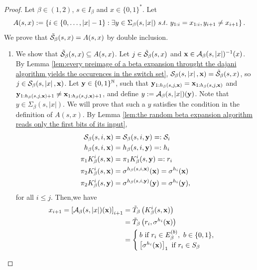\begin{proof}
    Let $\beta \in (1,2)$, $s \in I_\beta$ and $x \in \{0,1\}^\ast$. Let 
    \begin{equation}
        A(s,x) := \left\{ i \in \{0,\ldots, \left| x \right| -1\}: \exists y \in \Sigma_\beta(s,\left| x \right|) \ s.t. \ y_{1:i} = x_{1:i}, y_{i+1} \neq x_{i+1} \right\}.
    \end{equation}
    We prove that $\tilde {\mathcal{S}}_\beta(s,x) = A(s,x)$ by double inclusion.
    \begin{enumerate}[label = (\alph*)]
        \item We show that $\tilde {\mathcal{S}}_\beta(s,x) \subseteq  A(s,x)$. Let $j \in \tilde {\mathcal{S}}_\beta(s,x)$ and ${\bf x} \in \mathcal{A}_\beta(s,\left| x \right|)^{-1}(x)$. By Lemma \ref{lem:every preimage of a beta expansion throught the dajani algorithm yields the occurences in the switch set}, $\mathcal{S}_\beta(s,\left| x \right|, {\bf x}) = \tilde {\mathcal{S}}_\beta(s,x)$, so $j \in \mathcal{S}_\beta(s,\left| x \right|, {\bf x})$. Let ${\bf y} \in \{0,1\}^{\mathbb{N}}$, such that ${\bf y}_{1:h_\beta(s,j,{\bf x})} = {\bf x}_{1:h_\beta(s,j,{\bf x})}$ and ${\bf y}_{1:h_\beta(s,j,{\bf x})+1} \neq {\bf x}_{1:h_\beta(s,j,{\bf x})+1}$, and define $y := \mathcal{A}_\beta(s,\left| x \right|)({\bf y})$. Note that $y \in \Sigma_\beta(s,|x|)$. We will prove that such a $y$ satisfies the condition in the definition of $A(s,x)$. By Lemma \ref{lem:the random beta expansion algorithm reads only the first bits of its input}, 
        \begin{align}
            \mathcal{S}_\beta(s,i, {\bf x}) &= \mathcal{S}_\beta(s,i, {\bf y}) =: \mathcal{S}_i\\
            h_\beta(s,i,{\bf x}) &= h_\beta(s,i,{\bf y}) =: h_i\\
            \pi_1 K_\beta^i(s,{\bf x}) &= \pi_1 K_\beta^i(s,{\bf y}) =: r_i\\
            \pi_2 K_\beta^i(s,{\bf x}) &= \sigma^{h_\beta(s,i,{\bf x})}({\bf x}) = \sigma^{h_i}({\bf x})\\
            \pi_2 K_\beta^i(s,{\bf y}) &= \sigma^{h_\beta(s,i,{\bf y})}({\bf y}) = \sigma^{h_i}({\bf y}),
        \end{align}
        for all $i \leq j$. Then,we have 
        \begin{align}
            x_{i+1} = \left[\mathcal{A}_\beta(s,\left| x \right|)({\bf x})\right]_{i+1} &= \tilde T_\beta \left(K_\beta^i(s,{\bf x}) \right)\\
            &= \tilde T_\beta \left(r_i, \sigma^{h_i}({\bf x})\right)\\
            &= \begin{cases}
                b \ \text{if} \ r_i \in E_\beta^{(b)}, \ b \in \{0,1\},\\
                \left[\sigma^{h_i}({\bf x})\right]_1 \ \text{if} \ r_i \in S_\beta

\end{cases}
\end{align}
\end{enumerate}
\end{proof}
